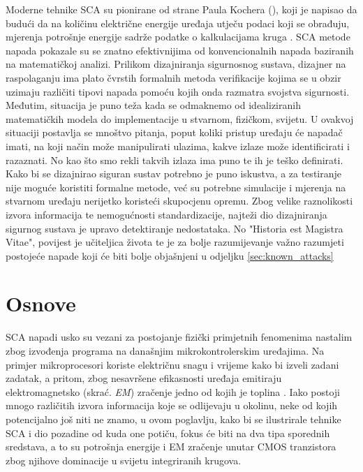 \documentclass[times, utf8, diplomski]{fer}
\begin{document}
Moderne tehnike SCA su pionirane od strane Paula Kochera (\citeyear{kocher1996timing, kocher1999differential, kocher2004security}), koji je napisao da budući da na količinu električne energije uređaja utječu podaci koji se obrađuju, mjerenja potrošnje energije sadrže podatke o kalkulacijama kruga \citep{kocher2011introduction}. SCA metode napada pokazale su se znatno efektivnijima od konvencionalnih napada baziranih na matematičkoj analizi. Prilikom dizajniranja sigurnosnog sustava, dizajner na raspolaganju ima plato čvrstih formalnih metoda verifikacije kojima se u obzir uzimaju različiti tipovi napada pomoću kojih onda razmatra svojstva sigurnosti. Međutim, situacija je puno teža kada se odmaknemo od idealiziranih matematičkih modela do implementacije u stvarnom, fizičkom, svijetu. U ovakvoj situaciji postavlja se mnoštvo pitanja, poput koliki pristup uređaju će napadač imati, na koji način može manipulirati ulazima, kakve izlaze može identificirati i razaznati. No kao što smo rekli takvih izlaza ima puno te ih je teško definirati. Kako bi se dizajnirao siguran sustav potrebno je puno iskustva, a za testiranje nije moguće koristiti formalne metode, već su potrebne simulacije i mjerenja na stvarnom uređaju nerijetko koristeći skupocjenu opremu. Zbog velike raznolikosti izvora informacija te nemogućnosti standardizacije, najteži dio dizajniranja sigurnog sustava je upravo detektiranje nedostataka. No "Historia est Magistra Vitae", povijest je učiteljica života te je za bolje razumijevanje važno razumjeti postojeće napade koji će biti bolje objašnjeni u odjeljku \ref{sec:known_attacks}

\section{Osnove}

SCA napadi usko su vezani za postojanje fizički primjetnih fenomenima nastalim zbog izvođenja programa na današnjim mikrokontrolerskim uređajima. Na primjer mikroprocesori koriste električnu snagu i vrijeme kako bi izveli zadani zadatak, a pritom, zbog nesavršene efikasnosti uređaja emitiraju elektromagnetsko (skrać. \emph{EM}) zračenje jedno od kojih je toplina \citep{standaert2010introduction}. Iako postoji mnogo različitih izvora informacija koje se odlijevaju u okolinu, neke od kojih potencijalno još niti ne znamo, u ovom poglavlju, kako bi se ilustrirale tehnike SCA i dio pozadine od kuda one potiču, fokus će biti na dva tipa sporednih sredstava, a to su potrošnja energije i EM zračenje unutar CMOS tranzistora zbog njihove dominacije u svijetu integriranih krugova.
\end{document}
